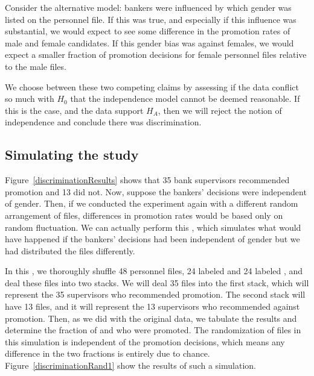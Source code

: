Consider the alternative model: bankers were influenced by which gender was listed on the personnel file. If this was true, and especially if this influence was substantial, we would expect to see some difference in the promotion rates of male and female candidates. If this gender bias was against females, we would expect a smaller fraction of promotion decisions for female personnel files relative to the male files.

We choose between these two competing claims by assessing if the data conflict so much with $H_0$ that the independence model cannot be deemed reasonable. If this is the case, and the data support $H_A$, then we will reject the notion of independence and conclude there was discrimination.

\subsection{Simulating the study}
\label{simulatingTheStudy}

Figure~\ref{discriminationResults} shows that 35 bank supervisors recommended promotion and 13 did not. Now, suppose the bankers' decisions were independent of gender. Then, if we conducted the experiment again with a different random arrangement of files, differences in promotion rates would be based only on random fluctuation. We can actually perform this , which simulates what would have happened if the bankers' decisions had been independent of gender but we had distributed the files differently.

In this , we thoroughly shuffle 48 personnel files, 24 labeled  and 24 labeled , and deal these files into two stacks. We will deal 35 files into the first stack, which will represent the 35 supervisors who recommended promotion. The second stack will have 13 files, and it will represent the 13 supervisors who recommended against promotion. Then, as we did with the original data, we tabulate the results and determine the fraction of  and  who were promoted. The randomization of files in this simulation is independent of the promotion decisions, which means any difference in the two fractions is entirely due to chance. Figure~\ref{discriminationRand1} show the results of such a simulation.

